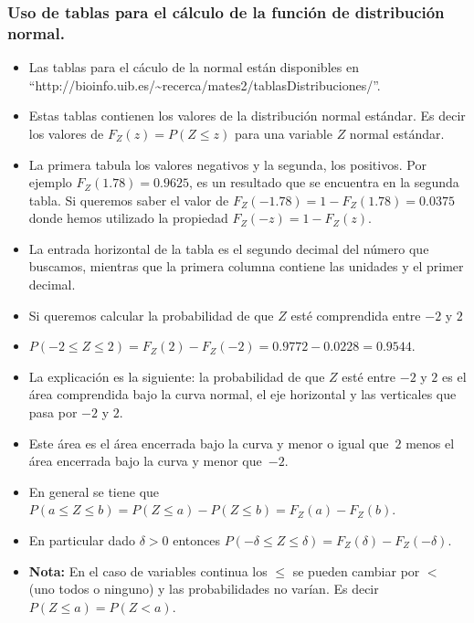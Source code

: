 \begin{frame}

\subsubsection{Uso de tablas para el cálculo de la función de distribución normal.}
\begin{itemize}
\item Las  tablas para el cáculo de la normal están disponibles  en ``http://bioinfo.uib.es/\~{}recerca/mates2/tablasDistribuciones/''.
\item Estas tablas contienen los valores de la distribución normal estándar. Es decir los valores de  $F_{Z}(z)=P(Z\leq z)$ para una variable
$Z$ normal estándar.
\item  La primera tabula los valores negativos y la segunda, los positivos. Por ejemplo $F_{Z}(1.78)=0.9625$, es un resultado que se encuentra en la
segunda tabla. Si queremos saber el valor de $F_Z(-1.78)=1-F_Z(1.78)=0.0375$ donde hemos utilizado la propiedad $F_Z(-z)=1-F_Z(z)$.
\item La entrada horizontal de la tabla es el segundo decimal del número que buscamos, mientras que la primera columna contiene las unidades y el
primer decimal.
\item Si queremos calcular la probabilidad de que $Z$ esté comprendida entre $-2$ y $2$ 
\item $P(-2\leq Z\leq 2)=F_Z(2)-F_Z(-2)=0.9772-0.0228=0.9544.$
\end{itemize}
\end{frame}

\begin{frame}
\begin{itemize}
\item La explicación es la siguiente: la probabilidad de que $Z$ esté entre $-2$ y $2$ es el área comprendida bajo la curva normal, el eje horizontal
y las verticales que pasa por $-2$ y $2$.
\item  Este área es el área encerrada bajo la curva y  menor o igual que~$2$ menos el área encerrada bajo la curva y menor que~$-2$.
\item En general se tiene que 
$P(a\leq Z\leq b)=P(Z\leq a)-P(Z\leq b)=F_Z(a)-F_Z(b).$
\item En particular dado $\delta>0$ entonces
$P(-\delta\leq Z \leq \delta)=F_{Z}(\delta)-F_{Z}(-\delta).$
\item \textbf{Nota:} En el caso de variables continua los $\leq$ se pueden cambiar por $<$ (uno todos o ninguno) y las probabilidades no varían. Es decir $P(Z\leq a)=P(Z< a)$.
\end{itemize}
\end{frame}

